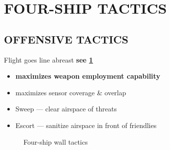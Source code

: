 \section{FOUR-SHIP TACTICS}
\label{sec:ttp_aa:tactics_4ship}

\subsection{OFFENSIVE TACTICS}

\begin{tcoloritemize}
    \blueitem[Wall]
    Flight goes line abreast
    \hfill\textbf{see \cref{fig:ttp_aa:4ship:offensive:wall}}
    \begin{itemize}
        \item \textbf{maximizes weapon employment capability}
        \item maximizes sensor coverage \& overlap
    \end{itemize}
    
    \begin{itemize}
        \item Sweep --- clear airspace of threats
        \item Escort --- sanitize airspace in front of friendlies
    \end{itemize}
\end{tcoloritemize}

\begin{figure}[htbp]
    \centering
    \caption{Four-ship wall tactics}%
    \label{fig:ttp_aa:4ship:offensive:wall}
\end{figure}

